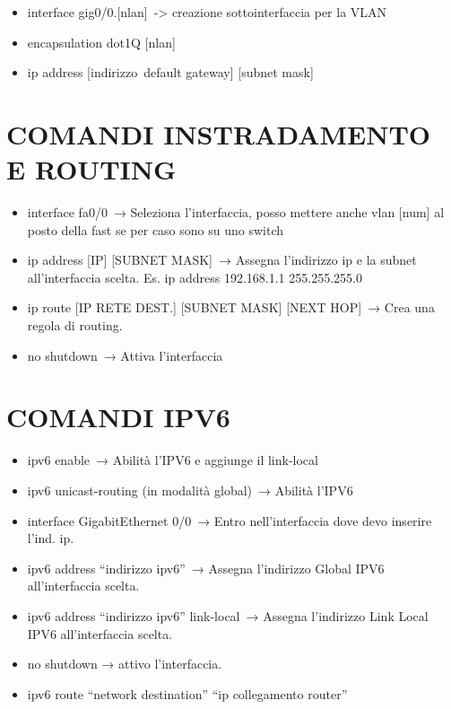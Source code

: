 \documentclass[
]{article}
\providecommand{\tightlist}{%
  \setlength{\itemsep}{0pt}\setlength{\parskip}{0pt}}
\begin{document}
\begin{itemize}
\tightlist
\item
  {interface gig0/0.}{{[}nlan{]}}{~-\textgreater{} creazione
  sottointerfaccia per la VLAN}
\item
  {encapsulation dot1Q {[}}{nlan}{{]}}
\item
  {ip address {[}}{indirizzo}{~default gateway{]} {[}subnet mask{]} }
\end{itemize}

{}

{}

\section{\texorpdfstring{{COMANDI INSTRADAMENTO E
ROUTING}}{COMANDI INSTRADAMENTO E ROUTING}}\label{h.mpx6bdf4yfjx}

\begin{itemize}
\tightlist
\item
  {interface fa0/0}{~→ Seleziona l'interfaccia, posso mettere anche vlan
  {[}num{]} al posto della fast se per caso sono su uno switch}
\item
  {ip address {[}IP{]} {[}SUBNET MASK{]}}{~}{→ Assegna l'indirizzo ip e
  la subnet all'interfaccia scelta. Es. ip address 192.168.1.1
  255.255.255.0}
\item
  {ip route {[}IP RETE DEST.{]} {[}SUBNET MASK{]} {[}NEXT HOP{]}}{~→
  Crea una regola di routing.}
\item
  {no shutdown}{~→ Attiva l'interfaccia}
\end{itemize}

{}

{}

\section{\texorpdfstring{{COMANDI
IPV6}}{COMANDI IPV6}}\label{h.sb6sx59gquqo}

\begin{itemize}
\tightlist
\item
  {ipv6 enable}{~→ Abilità l'IPV6 e aggiunge il link-local}
\item
  {ipv6 unicast-routing (in modalità global)}{~→ Abilità l'IPV6}
\item
  {interface GigabitEthernet 0/0}{~→ Entro nell'interfaccia dove devo
  inserire l'ind. ip.}
\item
  {ipv6 address ``indirizzo ipv6''}{~→ Assegna l'indirizzo Global IPV6
  all'interfaccia scelta.}
\item
  {ipv6 address ``indirizzo ipv6'' link-local}{~→ Assegna l'indirizzo
  Link Local IPV6 all'interfaccia scelta.}
\item
  {no shutdown }{→ attivo l'interfaccia.}
\item
  {ipv6 route ``network destination'' ``ip collegamento router''}
\end{itemize}
\end{document}

